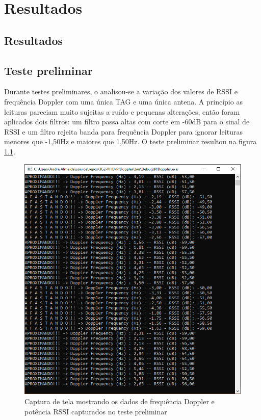 
\chapter{Resultados\label{chap:Resultados}}


\section{Resultados}

\section{Teste preliminar} \label{sect:testepreliminar}

Durante testes preliminares, o analisou-se a variação dos valores de RSSI e frequência Doppler com uma única TAG e uma única antena. A princípio as leituras pareciam muito sujeitas a ruído e pequenas alterações, então foram aplicados dois filtros: um filtro passa altas com corte em -60dB para o sinal de RSSI e um filtro rejeita banda para frequência Doppler para ignorar leituras menores que -1,50Hz e maiores que 1,50Hz. O teste preliminar resultou na figura \ref{fig:teste_preliminar}.
 
 \begin{figure}[ht]
    \centering
    \includegraphics[width=0.7\linewidth]{figs/Metodologia/teste_doppler+RSSI_corte_60db.PNG}
    \caption{Captura de tela mostrando os dados de frequência Doppler e potência RSSI capturados no teste preliminar}
    \label{fig:teste_preliminar}
\end{figure}
 
